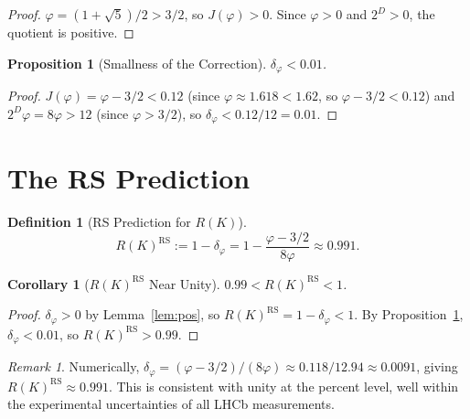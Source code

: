 \documentclass[12pt,a4paper]{article}
\newtheorem{corollary}[theorem]{Corollary}
\newtheorem{proposition}[theorem]{Proposition}
\theoremstyle{definition}
\newtheorem{definition}[theorem]{Definition}
\theoremstyle{remark}
\newtheorem{remark}[theorem]{Remark}
\begin{document}
\begin{proof}
$\varphi = (1 + \sqrt{5})/2 > 3/2$, so $J(\varphi) > 0$.
Since $\varphi > 0$ and $2^D > 0$, the quotient is positive.
\end{proof}

\begin{proposition}[Smallness of the Correction]
\label{thm:small}
$\delta_\varphi < 0.01$.
\end{proposition}

\begin{proof}
$J(\varphi) = \varphi - 3/2 < 0.12$ (since $\varphi \approx 1.618 < 1.62$,
so $\varphi - 3/2 < 0.12$) and $2^D\varphi = 8\varphi > 12$
(since $\varphi > 3/2$), so $\delta_\varphi < 0.12/12 = 0.01$.
\end{proof}

\section{The RS Prediction}
\label{sec:prediction}

\begin{definition}[RS Prediction for $R(K)$]
\begin{equation}
  R(K)^{\mathrm{RS}} := 1 - \delta_\varphi
  = 1 - \frac{\varphi - 3/2}{8\varphi} \approx 0.991.
\end{equation}
\end{definition}

\begin{corollary}[$R(K)^{\mathrm{RS}}$ Near Unity]
\label{thm:near-unity}
$0.99 < R(K)^{\mathrm{RS}} < 1$.
\end{corollary}

\begin{proof}
$\delta_\varphi > 0$ by Lemma~\ref{lem:pos}, so
$R(K)^{\mathrm{RS}} = 1 - \delta_\varphi < 1$.
By Proposition~\ref{thm:small}, $\delta_\varphi < 0.01$, so
$R(K)^{\mathrm{RS}} > 0.99$.
\end{proof}

\begin{remark}
Numerically, $\delta_\varphi = (\varphi - 3/2)/(8\varphi)
\approx 0.118/12.94 \approx 0.0091$, giving
$R(K)^{\mathrm{RS}} \approx 0.991$.  This is consistent with unity at
the percent level, well within the experimental uncertainties of all
LHCb measurements.
\end{remark}

\end{document}
